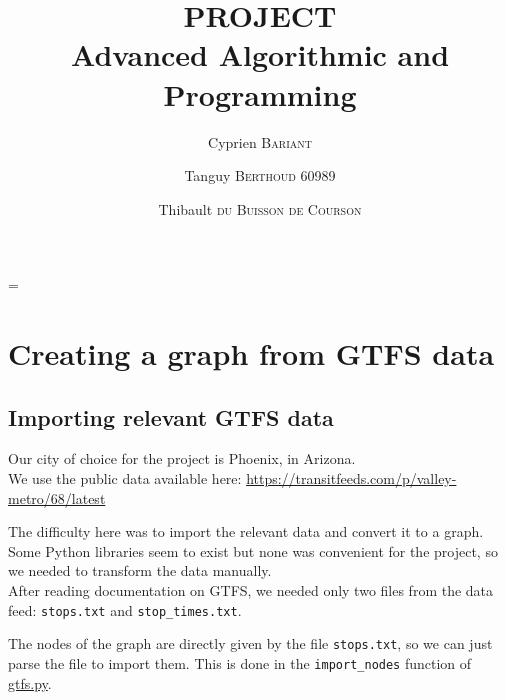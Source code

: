 \documentclass[12pt,english]{article}
\author{
	Cyprien \textsc{Bariant} %
	\and
	Tanguy \textsc{Berthoud} 60989
	\and
	Thibault \textsc{du Buisson de Courson} %
}
\title{
	\textbf{PROJECT}\\
	Advanced Algorithmic and Programming
}
\begin{document}
	\maketitle\newpage
	\thispagestyle{empty}
	\tableofcontents
	\listoffigures
	\listoftables
	\newpage
	\parskip=\baselineskip%

	\section{Creating a graph from GTFS data}\label{sec:step:1}
	\subsection{Importing relevant GTFS data}\label{sec:step:1.1}

	Our city of choice for the project is Phoenix, in Arizona.\\
	We use the public data available here: \url{https://transitfeeds.com/p/valley-metro/68/latest}

	The difficulty here was to import the relevant data and convert it to a graph.
	Some Python libraries seem to exist but none was convenient for the project, so we needed to transform the data manually.\\
	After reading documentation on GTFS, we needed only two files from the data feed: \texttt{stops.txt} and \texttt{stop\_times.txt}.

	\begin{center}
	\end{center}

	The nodes of the graph are directly given by the file \texttt{stops.txt}, so we can just parse the file to import them.
	This is done in the \texttt{import\_nodes} function of \hyperref[sec:code:gtfs]{\ttfamily gtfs.py}.
\end{document}
